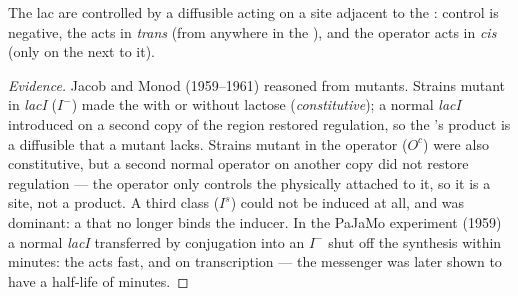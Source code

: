 \begin{proposition}\label{prop:b1:expression-control:jacobmonod}
The lac  are controlled by a diffusible  acting on a
site adjacent to the : control is negative, the  acts in
\emph{trans} (from anywhere in the ), and the operator acts in
\emph{cis} (only on the  next to it).
\end{proposition}
\begin{proof}[Evidence]
Jacob and Monod (1959--1961) reasoned from mutants. Strains mutant in
\emph{lacI} ($I^-$) made the  with or without lactose
(\emph{constitutive}); a normal \emph{lacI}  introduced on a second
copy of the region restored regulation, so the 's product is a
diffusible  that a mutant lacks. Strains mutant in the
operator ($O^c$) were also constitutive, but a second normal operator
on another copy did not restore regulation --- the operator only
controls the  physically attached to it, so it is a site, not a
product. A third class ($I^s$) could not be induced at all, and was
dominant: a  that no longer binds the inducer. In the PaJaMo
experiment (1959) a normal \emph{lacI}  transferred by conjugation
into an $I^-$  shut off the  synthesis within minutes: the
 acts fast, and on transcription --- the messenger was later
shown to have a half-life of minutes.
\end{proof}

